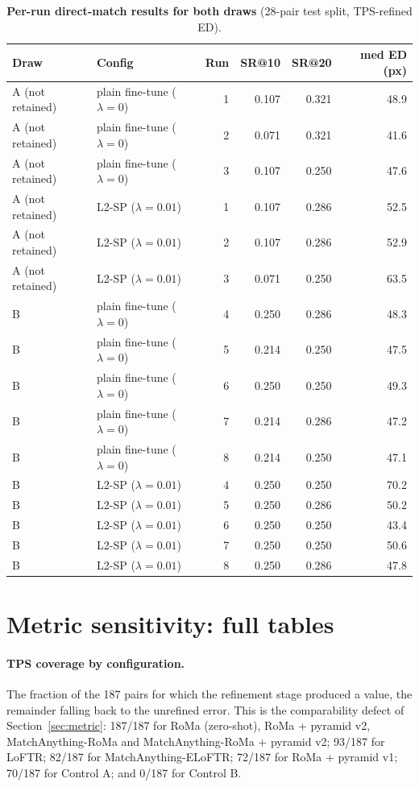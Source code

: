 \documentclass[10pt]{article}
\begin{document}
\begin{table}[ht]
\centering
\small
\begin{tabular}{llrrrr}
\toprule
Draw & Config & Run & SR@10 & SR@20 & med ED (px) \\
\midrule
A (not retained) & plain fine-tune ($\lambda{=}0$) & 1 & 0.107 & 0.321 & 48.9 \\
A (not retained) & plain fine-tune ($\lambda{=}0$) & 2 & 0.071 & 0.321 & 41.6 \\
A (not retained) & plain fine-tune ($\lambda{=}0$) & 3 & 0.107 & 0.250 & 47.6 \\
A (not retained) & L2-SP ($\lambda{=}0.01$)        & 1 & 0.107 & 0.286 & 52.5 \\
A (not retained) & L2-SP ($\lambda{=}0.01$)        & 2 & 0.107 & 0.286 & 52.9 \\
A (not retained) & L2-SP ($\lambda{=}0.01$)        & 3 & 0.071 & 0.250 & 63.5 \\
\midrule
B & plain fine-tune ($\lambda{=}0$) & 4 & 0.250 & 0.286 & 48.3 \\
B & plain fine-tune ($\lambda{=}0$) & 5 & 0.214 & 0.250 & 47.5 \\
B & plain fine-tune ($\lambda{=}0$) & 6 & 0.250 & 0.250 & 49.3 \\
B & plain fine-tune ($\lambda{=}0$) & 7 & 0.214 & 0.286 & 47.2 \\
B & plain fine-tune ($\lambda{=}0$) & 8 & 0.214 & 0.250 & 47.1 \\
B & L2-SP ($\lambda{=}0.01$)        & 4 & 0.250 & 0.250 & 70.2 \\
B & L2-SP ($\lambda{=}0.01$)        & 5 & 0.250 & 0.286 & 50.2 \\
B & L2-SP ($\lambda{=}0.01$)        & 6 & 0.250 & 0.250 & 43.4 \\
B & L2-SP ($\lambda{=}0.01$)        & 7 & 0.250 & 0.250 & 50.6 \\
B & L2-SP ($\lambda{=}0.01$)        & 8 & 0.250 & 0.286 & 47.8 \\
\bottomrule
\end{tabular}
\caption{\textbf{Per-run direct-match results for both draws} (28-pair test split, TPS-refined ED).}
\label{tab:seeds}
\end{table}

\section{Metric sensitivity: full tables}
\label{app:metric}

\paragraph{TPS coverage by configuration.} The fraction of the 187 pairs for which the refinement stage produced a value, the remainder falling back to the unrefined error. This is the comparability defect of Section~\ref{sec:metric}: 187/187 for RoMa (zero-shot), RoMa + pyramid v2, MatchAnything-RoMa and MatchAnything-RoMa + pyramid v2; 93/187 for LoFTR; 82/187 for MatchAnything-ELoFTR; 72/187 for RoMa + pyramid v1; 70/187 for Control A; and 0/187 for Control B.
\end{document}
